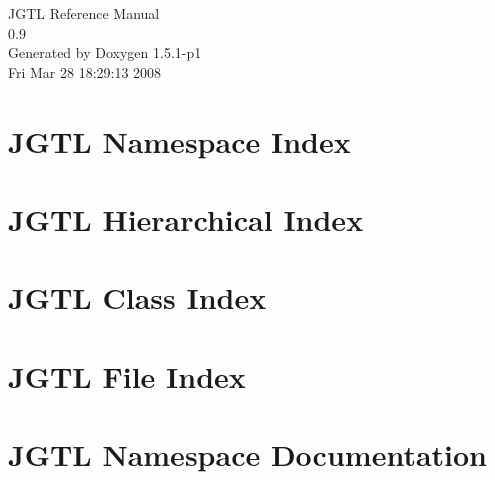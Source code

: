 \documentclass[letterpaper]{book}
\begin{document}
\begin{titlepage}
\vspace*{7cm}
\begin{center}
{\Large JGTL Reference Manual\\[1ex]\large 0.9 }\\
\vspace*{1cm}
{\large Generated by Doxygen 1.5.1-p1}\\
\vspace*{0.5cm}
{\small Fri Mar 28 18:29:13 2008}\\
\end{center}
\end{titlepage}
\clearemptydoublepage
{}
\tableofcontents
\clearemptydoublepage
{}
\chapter{JGTL Namespace Index}

\chapter{JGTL Hierarchical Index}

\chapter{JGTL Class Index}

\chapter{JGTL File Index}

\chapter{JGTL Namespace Documentation}


\end{document}
